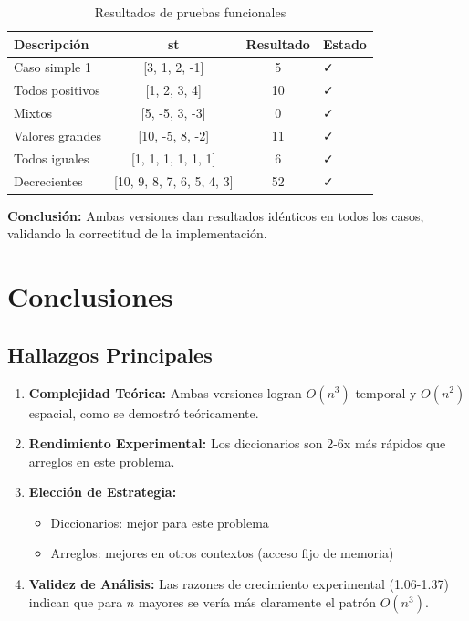 \documentclass[12pt,letterpaper]{article}
\begin{document}
\begin{table}[H]
\centering
\caption{Resultados de pruebas funcionales}
\begin{tabular}{lccl}
\toprule
Descripción & st & Resultado & Estado \\
\midrule
Caso simple 1 & [3, 1, 2, -1] & 5 & ✓ \\
Todos positivos & [1, 2, 3, 4] & 10 & ✓ \\
Mixtos & [5, -5, 3, -3] & 0 & ✓ \\
Valores grandes & [10, -5, 8, -2] & 11 & ✓ \\
Todos iguales & [1, 1, 1, 1, 1, 1] & 6 & ✓ \\
Decrecientes & [10, 9, 8, 7, 6, 5, 4, 3] & 52 & ✓ \\
\bottomrule
\end{tabular}
\end{table}

\textbf{Conclusión:} Ambas versiones dan resultados idénticos en todos los casos, validando la correctitud de la implementación.

\section{Conclusiones}

\subsection{Hallazgos Principales}

\begin{enumerate}
    \item \textbf{Complejidad Teórica:} Ambas versiones logran $O(n^3)$ temporal y $O(n^2)$ espacial, como se demostró teóricamente.
    
    \item \textbf{Rendimiento Experimental:} Los diccionarios son 2-6x más rápidos que arreglos en este problema.
    
    \item \textbf{Elección de Estrategia:}
    \begin{itemize}
        \item Diccionarios: mejor para este problema
        \item Arreglos: mejores en otros contextos (acceso fijo de memoria)
    \end{itemize}
    
    \item \textbf{Validez de Análisis:} Las razones de crecimiento experimental (1.06-1.37) indican que para $n$ mayores se vería más claramente el patrón $O(n^3)$.
\end{enumerate}
\end{document}
